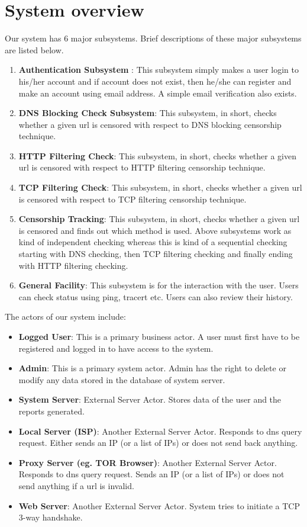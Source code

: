 \documentclass[12pt]{article}
\begin{document}
\section{System overview}
Our system has 6 major subsystems. Brief descriptions of these major subsystems are listed below.
\begin{enumerate}
    \item \textbf{Authentication Subsystem} : This subsystem simply makes a user login to his/her account and if account does not exist, then he/she can register and make an account using email address. A simple email verification also exists.
    \item \textbf{DNS Blocking Check Subsystem}: This subsystem, in short, checks whether a given url is censored with respect to DNS blocking censorship technique.
    \item \textbf{HTTP Filtering Check}: This subsystem, in short, checks whether a given url is censored with respect to HTTP filtering censorship technique.
    \item \textbf{TCP Filtering Check}: This subsystem, in short, checks whether a given url is censored with respect to TCP filtering censorship technique.
    \item \textbf{Censorship Tracking}: This subsystem, in short, checks whether a given url is censored and finds out which method is used. Above subsystems work as kind of independent checking whereas this is kind of a sequential checking starting with DNS checking, then TCP filtering checking and finally ending with HTTP filtering checking.
    \item \textbf{General Facility}: This subsystem is for the interaction with the user. Users can check status using ping, tracert etc. Users can also review their history.
\end{enumerate}
The actors of our system include: 
\begin{itemize}
    \item \textbf{Logged User}: This is a primary business actor. A user must first have to be registered and logged in to have access to the system.
    \item \textbf{Admin}: This is a primary system actor. Admin has the right to delete or modify any data stored in the database of system server.
    \item \textbf{System Server}: External Server Actor. Stores data of the user and the reports generated.
    \item \textbf{Local Server (ISP)}: Another External Server Actor. Responds to dns query request. Either sends an IP (or a list of IPs) or does not send back anything.
    \item \textbf{Proxy Server (eg. TOR Browser)}: Another External Server Actor. Responds to dns query request. Sends an IP (or a list of IPs) or does not send anything if a url is invalid.
    \item \textbf{Web Server}: Another External Server Actor. System tries to initiate a TCP 3-way handshake. %
\end{itemize}
\end{document}
